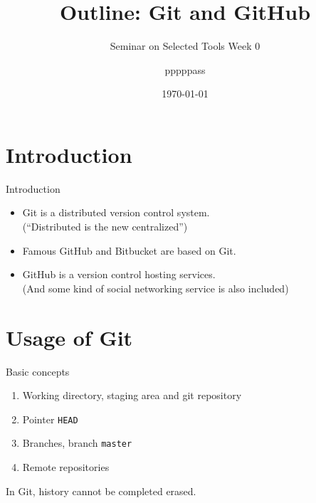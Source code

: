 \documentclass[english, nochinese]{pkuslide}
\title{Outline: Git and GitHub}
\subtitle{Seminar on Selected Tools Week 0}
\author{pppppass}
\date{\today}
\begin{document}
\begin{frame}
\titlepage
\end{frame}

\begin{frame}
\tableofcontents[subsectionstyle=show]
\end{frame}

\section{Introduction}

\begin{frame}
\sectionpage
\end{frame}

\begin{frame}{Introduction}
\begin{itemize}
\item Git is a distributed version control system. \\
(``Distributed is the new centralized'')
\item Famous GitHub and Bitbucket are based on Git.
\item GitHub is a version control hosting services. \\
(And some kind of social networking service is also included)
\end{itemize}
\end{frame}

\section{Usage of Git}

\begin{frame}
\sectionpage
\end{frame}

\begin{frame}[fragile]{Basic concepts}
\begin{enumerate}
\item Working directory, staging area and git repository
\item Pointer \verb"HEAD"
\item Branches, branch \verb"master"
\item Remote repositories
\end{enumerate}
In Git, history \alert{cannot} be completed erased.
\end{frame}
\end{document}
